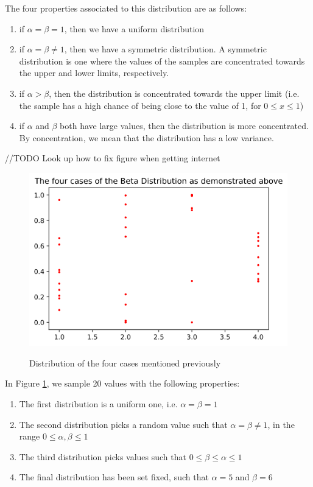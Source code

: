 \documentclass{article}
\begin{document}
The four properties associated to this distribution are as follows:
\begin{enumerate}
    \item if $\alpha = \beta = 1$, then we have a uniform distribution
    \item if $\alpha = \beta \neq 1$, then we have a symmetric distribution. A symmetric distribution is one where the values of the samples are concentrated towards the upper and lower limits, respectively.
    \item if $\alpha > \beta$, then the distribution is concentrated towards the upper limit (i.e. the sample has a high chance of being close to the value of 1, for $0 \leq x \leq 1$)
    \item if $\alpha$ and $\beta$ both have large values, then the distribution is more concentrated. By concentration, we mean that the distribution has a low variance.
\end{enumerate}
//TODO Look up how to fix figure when getting internet
\begin{figure}
	\centering
	\includegraphics{test_results/beta_distributions}
	\label{fig1_betaDistribution}
	\caption{Distribution of the four cases mentioned previously}
\end{figure}

In Figure \ref{fig1_betaDistribution}, we sample 20 values with the following properties:
\begin{enumerate}
	\item The first distribution is a uniform one, i.e. $\alpha = \beta = 1$
	\item The second distribution picks a random value such that $\alpha = \beta \neq 1$, in the range $0 \leq \alpha, \beta \leq 1$
	\item The third distribution picks values such that $0 \leq \beta \leq \alpha \leq 1$
	\item The final distribution has been set fixed, such that $\alpha = 5$ and $\beta = 6$
\end{enumerate}
\end{document}
